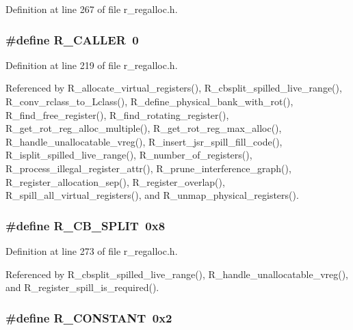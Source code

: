 Definition at line 267 of file r\_\-regalloc.h.
\subsubsection{\setlength{\rightskip}{0pt plus 5cm}\#define R\_\-CALLER~0}\label{r__regalloc_8h_8ee379b39a84fa159b2e2728293a12ee}




Definition at line 219 of file r\_\-regalloc.h.

Referenced by R\_\-allocate\_\-virtual\_\-registers(), R\_\-cbsplit\_\-spilled\_\-live\_\-range(), R\_\-conv\_\-rclass\_\-to\_\-Lclass(), R\_\-define\_\-physical\_\-bank\_\-with\_\-rot(), R\_\-find\_\-free\_\-register(), R\_\-find\_\-rotating\_\-register(), R\_\-get\_\-rot\_\-reg\_\-alloc\_\-multiple(), R\_\-get\_\-rot\_\-reg\_\-max\_\-alloc(), R\_\-handle\_\-unallocatable\_\-vreg(), R\_\-insert\_\-jsr\_\-spill\_\-fill\_\-code(), R\_\-isplit\_\-spilled\_\-live\_\-range(), R\_\-number\_\-of\_\-registers(), R\_\-process\_\-illegal\_\-register\_\-attr(), R\_\-prune\_\-interference\_\-graph(), R\_\-register\_\-allocation\_\-sep(), R\_\-register\_\-overlap(), R\_\-spill\_\-all\_\-virtual\_\-registers(), and R\_\-unmap\_\-physical\_\-registers().
\subsubsection{\setlength{\rightskip}{0pt plus 5cm}\#define R\_\-CB\_\-SPLIT~0x8}\label{r__regalloc_8h_cefa5449da5ae235059aca331ab1ffcc}




Definition at line 273 of file r\_\-regalloc.h.

Referenced by R\_\-cbsplit\_\-spilled\_\-live\_\-range(), R\_\-handle\_\-unallocatable\_\-vreg(), and R\_\-register\_\-spill\_\-is\_\-required().
\subsubsection{\setlength{\rightskip}{0pt plus 5cm}\#define R\_\-CONSTANT~0x2}\label{r__regalloc_8h_592e5af0fc7d8acfa696b84184e671b3}





